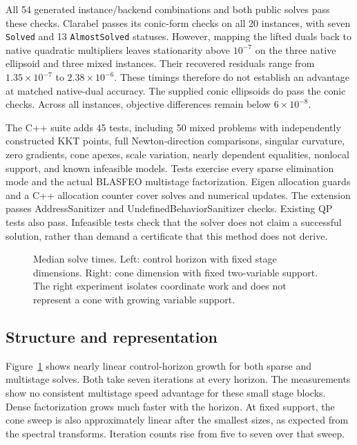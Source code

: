 All 54 generated instance/backend combinations and both public solves pass these checks. Clarabel passes its conic-form checks on all 20 instances, with seven \texttt{Solved} and 13 \texttt{AlmostSolved} statuses. However, mapping the lifted duals back to native quadratic multipliers leaves stationarity above $10^{-7}$ on the three native ellipsoid and three mixed instances. Their recovered residuals range from $1.35\times10^{-7}$ to $2.38\times10^{-6}$. These timings therefore do not establish an advantage at matched native-dual accuracy. The supplied conic ellipsoids do pass the conic checks. Across all instances, objective differences remain below $6\times10^{-8}$.

The C++ suite adds 45 tests, including 50 mixed problems with independently constructed KKT points, full Newton-direction comparisons, singular curvature, zero gradients, cone apexes, scale variation, nearly dependent equalities, nonlocal support, and known infeasible models. Tests exercise every sparse elimination mode and the actual BLASFEO multistage factorization. Eigen allocation guards and a C++ allocation counter cover solves and numerical updates. The extension passes AddressSanitizer and UndefinedBehaviorSanitizer checks. Existing QP tests also pass. Infeasible tests check that the solver does not claim a successful solution, rather than demand a certificate that this method does not derive.

\begin{table}[t]
\centering
\caption{Median solve time in milliseconds. Clarabel uses exact cone reformulations for native quadratic rows.}
\label{tab:time}
\small
\end{table}

\begin{figure}[t]
\centering
\caption{Median solve times. Left: control horizon with fixed stage dimensions. Right: cone dimension with fixed two-variable support. The right experiment isolates coordinate work and does not represent a cone with growing variable support.}
\label{fig:scaling}
\end{figure}

\subsection{Structure and representation}
Figure~\ref{fig:scaling} shows nearly linear control-horizon growth for both sparse and multistage solves. Both take seven iterations at every horizon. The measurements show no consistent multistage speed advantage for these small stage blocks. Dense factorization grows much faster with the horizon. At fixed support, the cone sweep is also approximately linear after the smallest sizes, as expected from the spectral transforms. Iteration counts rise from five to seven over that sweep.

